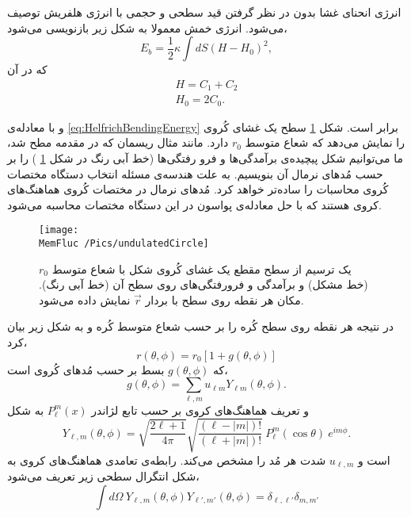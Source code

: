 

انرژی انحنای غشا بدون در نظر گرفتن قید سطحی و حجمی با انرژی هلفریش 
\cite{Helfrich1973}
توصیف می‌شود. انرژی خمش معمولا به شکل زیر بازنویسی می‌شود،
\begin{equation}
E_{b}=\frac{1}{2}\kappa\int dS\left(H-H_0\right)^2,
\label{eq:HelfrichBendingEnergyH}
\end{equation}
که در آن
\begin{equation}
\begin{aligned}
H=C_1+C_2\\
H_0=2C_0.
\end{aligned}
\end{equation}

و با معادله‌ی 
\ref{eq:HelfrichBendingEnergy}
برابر است. شکل
\ref{fig:undulatedCircle}
سطح یک غشای کُروی را نمایش می‌دهد که شعاع متوسط 
$r_0$
دارد. مانند مثال ریسمان که در مقدمه مطح شد، ما می‌توانیم شکل پیچیده‌ی برآمدگی‌ها و فرو رفتگی‌ها (خط آبی رنگ در شکل 
\ref{fig:undulatedCircle}
) را بر حسب مُد‌های نرمال آن بنویسیم. به علت هندسه‌ی مسئله انتخاب دستگاه مختصات کُروی محاسبات را ساده‌تر خواهد کرد. مُد‌های نرمال در مختصات کُروی هماهنگ‌های کروی
هستند که با حل معادله‌ی پواسون در این دستگاه مختصات محاسبه می‌شود. 
\begin{figure}[h]
\begin{center}
\texttt{[image: \\MemFluc /Pics/undulatedCircle]}
\caption{
یک ترسیم از سطح مقطع یک غشای کُروی شکل با شعاع متوسط 
$r_0$
(خط مشکل) و برآمدگی و فرورفتگی‌های روی سطح آن (خط آبی رنگ). مکان هر نقطه روی سطح با بردار 
$\vec r$
نمایش داده می‌شود.
}
\label{fig:undulatedCircle}
\end{center}
\end{figure}
در نتیجه هر نقطه روی سطح کُره را بر حسب شعاع متوسط کُره و به شکل زیر بیان کرد،
\begin{equation}
r(\theta,\phi)=r_0\left[1+g(\theta,\phi)\right]
\end{equation}
که 
$g(\theta,\phi)$
بسط بر حسب مُدهای کُروی است،
\begin{equation}
g(\theta,\phi)=\sum_{\ell,m}u_{\ell m}Y_{\ell m} (\theta,\phi).
\label{eq:gdef}
\end{equation}
و تعریف هماهنگ‌های کروی بر حسب تابع لژاندر
$P_\ell^m(x)$
به شکل
\begin{equation}
Y_{\ell,m}(\theta,\phi)=\sqrt{\frac{2\ell+1}{4\pi}}\sqrt{\frac{(\ell-|m|)!}{(\ell+|m|)!}}~P_\ell^m(\cos\theta)~e^{im\phi}.
\label{eq:rYlmLogandre}
\end{equation}
است و 
$u_{\ell,m}$
شدت هر مُد را مشخص می‌کند. رابطه‌ی تعامدی هماهنگ‌های کروی به شکل انتگرال سطحی زیر تعریف می‌شود،
\begin{equation}
\int d\Omega~Y_{\ell,m}(\theta,\phi)Y_{\ell',m'}(\theta,\phi)=\delta_{\ell,\ell'}\delta_{m,m'}
\label{eq:rYlmOrthonormal}
\end{equation}


